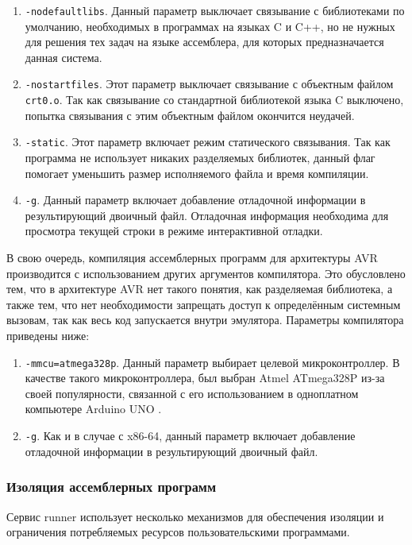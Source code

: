 \documentclass[a4paper,article,14pt]{extarticle}
\begin{document}
\begin{enumerate}
    \item \texttt{-nodefaultlibs}. Данный параметр выключает связывание с библиотеками по умолчанию, необходимых в программах на языках C и C++, но не нужных для решения тех задач на языке ассемблера, для которых предназначается данная система.
    \item \texttt{-nostartfiles}. Этот параметр выключает связывание с объектным файлом \texttt{crt0.o}. Так как связывание со стандартной библиотекой языка C выключено, попытка связывания с этим объектным файлом окончится неудачей.
    \item \texttt{-static}. Этот параметр включает режим статического связывания. Так как программа не использует никаких разделяемых библиотек, данный флаг помогает уменьшить размер исполняемого файла и время компиляции.
    \item \texttt{-g}. Данный параметр включает добавление отладочной информации в результирующий двоичный файл. Отладочная информация необходима для просмотра текущей строки в режиме интерактивной отладки.
\end{enumerate}

В свою очередь, компиляция ассемблерных программ для архитектуры AVR производится с использованием других аргументов компилятора. Это обусловлено тем, что в архитектуре AVR нет такого понятия, как разделяемая библиотека, а также тем, что нет необходимости запрещать доступ к определённым системным вызовам, так как весь код запускается внутри эмулятора. Параметры компилятора приведены ниже:

\begin{enumerate}
    \item \texttt{-mmcu=atmega328p}. Данный параметр выбирает целевой микроконтроллер. В качестве такого микроконтроллера, был выбран Atmel ATmega328P из-за своей популярности, связанной с его использованием в одноплатном компьютере Arduino UNO \cite{arduinouno}.
    \item \texttt{-g}. Как и в случае с x86-64, данный параметр включает добавление отладочной информации в результирующий двоичный файл.
\end{enumerate}

\subsubsection{Изоляция ассемблерных программ}

Сервис runner использует несколько механизмов для обеспечения изоляции и ограничения потребляемых ресурсов пользовательскими программами.
\end{document}
